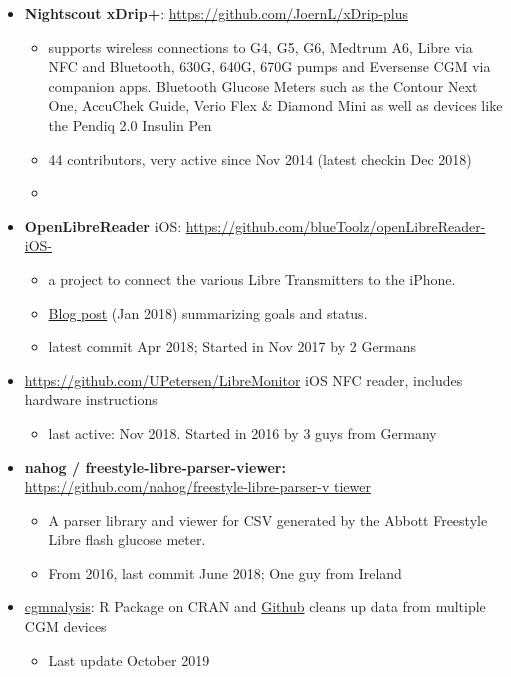 \documentclass[
]{book}
\providecommand{\tightlist}{%
  \setlength{\itemsep}{0pt}\setlength{\parskip}{0pt}}
\begin{document}
\begin{itemize}
\tightlist
\item
  \textbf{Nightscout xDrip+}: \url{https://github.com/JoernL/xDrip-plus}

  \begin{itemize}
  \tightlist
  \item
    supports wireless connections to G4, G5, G6, Medtrum A6, Libre via NFC and Bluetooth, 630G, 640G, 670G pumps and Eversense CGM via companion apps. Bluetooth Glucose Meters such as the Contour Next One, AccuChek Guide, Verio Flex \& Diamond Mini as well as devices like the Pendiq 2.0 Insulin Pen
  \item
    44 contributors, very active since Nov 2014 (latest checkin Dec 2018)
  \item
  \end{itemize}
\item
  \textbf{OpenLibreReader} iOS: \url{https://github.com/blueToolz/openLibreReader-iOS-}

  \begin{itemize}
  \tightlist
  \item
    a project to connect the various Libre Transmitters to the iPhone.
  \item
    \href{https://unendlichkeit.net/wordpress/openlibrereader-and-status/?lang=en}{Blog post} (Jan 2018) summarizing goals and status.
  \item
    latest commit Apr 2018; Started in Nov 2017 by 2 Germans
  \end{itemize}
\item
  \url{https://github.com/UPetersen/LibreMonitor} iOS NFC reader, includes hardware instructions

  \begin{itemize}
  \tightlist
  \item
    last active: Nov 2018. Started in 2016 by 3 guys from Germany
  \end{itemize}
\item
  \textbf{nahog / freestyle-libre-parser-viewer: }\href{https://github.com/nahog/freestyle-libre-parser-viewer}{https://github.com/nahog/freestyle-libre-parser-v tiewer}

  \begin{itemize}
  \tightlist
  \item
    A parser library and viewer for CSV generated by the Abbott Freestyle Libre flash glucose meter.
  \item
    From 2016, last commit June 2018; One guy from Ireland
  \end{itemize}
\item
  \href{https://cran.r-project.org/web/packages/cgmanalysis/index.html}{cgmnalysis}: R Package on CRAN and \href{https://github.com/childhealthbiostatscore/R-Packages}{Github} cleans up data from multiple CGM devices

  \begin{itemize}
  \tightlist
  \item
    Last update October 2019
  \end{itemize}
\end{itemize}
\end{document}
